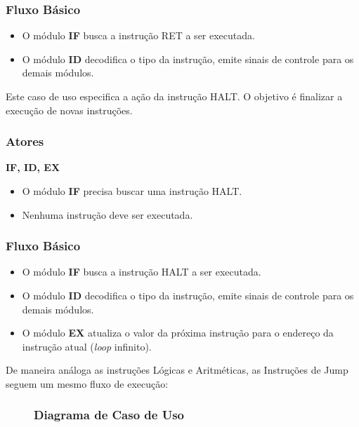 \subsubsection*{Fluxo Básico}
\begin{itemize}
	\item O módulo \textbf{IF} busca a instrução RET a ser executada.
	\item O módulo \textbf{ID} decodifica o tipo da instrução, emite sinais de controle para os demais módulos.
\end{itemize}


Este caso de uso especifica a ação da instrução HALT. O objetivo é finalizar a execução de novas instruções.

\subsubsection*{Atores}
\textbf{IF, ID, EX}

\preconditions 
\begin{itemize}
	\item O módulo \textbf{IF} precisa buscar uma instrução HALT.
\end{itemize}

\postconditions
\begin{itemize}
	\item Nenhuma instrução deve ser executada.
\end{itemize}

\subsubsection*{Fluxo Básico}
\begin{itemize}
	\item O módulo \textbf{IF} busca a instrução HALT a ser executada.
	\item O módulo \textbf{ID} decodifica o tipo da instrução, emite sinais de controle para os demais módulos.
	\item O módulo \textbf{EX} atualiza o valor da próxima instrução para o endereço da instrução atual (\textit{loop} infinito).
\end{itemize}

De maneira análoga as instruções Lógicas e Aritméticas, as Instruções de Jump seguem um mesmo fluxo de execução:

\begin{figure}[H]
	\subsubsection*{Diagrama de Caso de Uso}
	
\end{figure}
